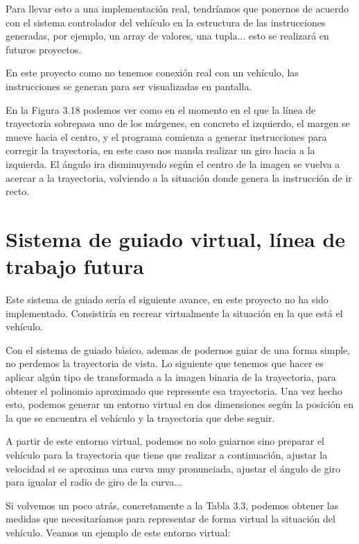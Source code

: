 Para llevar esto a una implementación real, tendríamos que ponernos de acuerdo con el sistema controlador del vehículo en la estructura de las instrucciones generadas, por ejemplo, un array de valores, una tupla... esto se realizará en futuros proyectos.

En este proyecto como no tenemos conexión real con un vehículo, las instrucciones se generan para ser visualizadas en pantalla.


En la Figura 3.18 podemos ver como en el momento en el que la línea de trayectoria sobrepasa uno de los márgenes, en concreto el izquierdo, el margen se mueve hacia el centro, y el programa comienza a generar instrucciones para corregir la trayectoria, en este caso nos manda realizar un giro hacia a la izquierda. El ángulo ira disminuyendo según el centro de la imagen se vuelva a acercar a la trayectoria, volviendo a la situación donde genera la instrucción de ir recto.


\section{Sistema de guiado virtual, línea de trabajo futura}
Este sistema de guiado sería el siguiente avance, en este proyecto no ha sido implementado. Consistiría en recrear virtualmente la situación en la que está el vehículo. 

Con el sistema de guiado básico, ademas de podernos guiar de una forma simple, no perdemos la trayectoria de vista. Lo siguiente que tenemos que hacer es aplicar algún tipo de transformada a la imagen binaria de la trayectoria, para obtener el polinomio aproximado que represente esa trayectoria. Una vez hecho esto, podemos generar un entorno virtual en dos dimensiones según la posición en la que se encuentra el vehículo y la trayectoria que debe seguir.

A partir de este entorno virtual, podemos no solo guiarnos sino preparar el vehículo para la trayectoria que tiene que realizar a continuación, ajustar la velocidad si se aproxima una curva muy pronunciada, ajustar el ángulo de giro para igualar el radio de giro de la curva...

Si volvemos un poco atrás, concretamente a la Tabla 3.3, podemos obtener las medidas que necesitaríamos para representar de forma virtual la situación del vehículo. Veamos un ejemplo de este entorno virtual:


